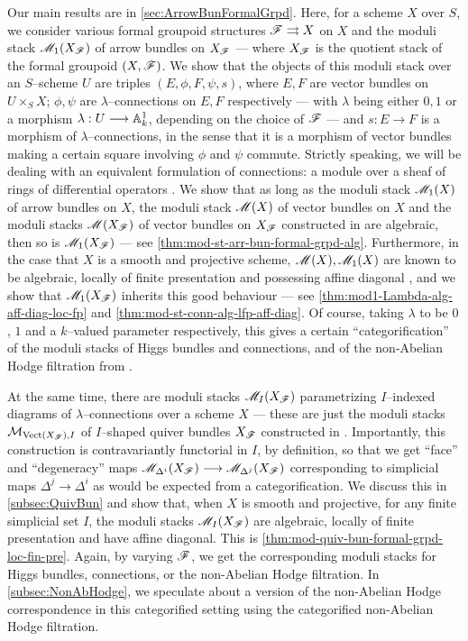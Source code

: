 \documentclass[11pt]{amsart}
\begin{document}
Our main results are in \cref{sec:ArrowBunFormalGrpd}.  Here, for a scheme $X$
over $S$, we consider various formal groupoid structures
$\mathscr{F} \rightrightarrows X$ on $X$ and the moduli stack $\mathscr{M}_1(X_\mathscr{F})$ of arrow
bundles on $X_\mathscr{F}$ --- where $X_\mathscr{F}$ is the quotient stack of the formal
groupoid $(X, \mathscr{F})$. We show that the objects of this moduli stack over an
$S$--scheme $U$ are triples $(E, \phi, F, \psi, s)$, where $E, F$ are vector
bundles on $U \times_S X$; $\phi, \psi$ are $\lambda$--connections on $E, F$
respectively --- with $\lambda$ being either $0, 1$ or a morphism
$\lambda : U \to \bA^1_k$, depending on the choice of $\mathscr{F}$ --- and
$s : E \to F$ is a morphism of $\lambda$--connections, in the sense that it is a
morphism of vector bundles making a certain square involving $\phi$ and $\psi$
commute.  Strictly speaking, we will be dealing with an equivalent formulation
of connections: a module over a sheaf of rings of differential operators
\cite[\S 2]{ModRepFunGrpI}.  We show that as long as the moduli stack $\mathscr{M}_1(X)$
of arrow bundles on $X$, the moduli stack $\mathscr{M}(X)$ of vector bundles on $X$ and
the moduli stacks $\mathscr{M}(X_\mathscr{F})$ of vector bundles on $X_\mathscr{F}$ constructed in
\cite[31---33]{NonAbHodgeFilt} are algebraic, then so is $\mathscr{M}_1(X_\mathscr{F})$ --- see
\cref{thm:mod-st-arr-bun-formal-grpd-alg}.  Furthermore, in the case that $X$ is
a smooth and projective scheme, $\mathscr{M}(X), \mathscr{M}_1(X)$ are known to be algebraic,
locally of finite presentation and possessing affine diagonal
\cites{Wang-BunG, ModQuivBun}, and we show that $\mathscr{M}_1(X_\mathscr{F})$ inherits this
good behaviour --- see \cref{thm:mod1-Lambda-alg-aff-diag-loc-fp} and
\cref{thm:mod-st-conn-alg-lfp-aff-diag}. Of course, taking $\lambda$ to be
$0$, $1$ and a $k$--valued parameter respectively, this gives a certain
``categorification'' of the moduli stacks of Higgs bundles and connections, and
of the non-Abelian Hodge filtration from \cite[31---33]{NonAbHodgeFilt}.

At the same time, there are moduli stacks $\mathscr{M}_I(X_\mathscr{F})$ parametrizing
$I$--indexed diagrams of $\lambda$--connections over a scheme $X$ --- these are
just the moduli stacks $\mathcal{M}_{\mathrm{Vect}(X_\mathscr{F}), I}$ of $I$--shaped quiver bundles
$X_\mathscr{F}$ constructed in \cite[\S 4]{ModQuivBun}.  Importantly, this construction
is contravariantly functorial in $I$, by definition, so that we get ``face'' and
``degeneracy'' maps $\sM_{\Delta^i}(X_\sF) \to \sM_{\Delta^j}(X_\sF)$
corresponding to simplicial maps $\Delta^j \to \Delta^i$ as would be expected
from a categorification.  We discuss this in \cref{subsec:QuivBun} and show
that, when $X$ is smooth and projective, for any finite simplicial set $I$, the
moduli stacks $\mathscr{M}_I(X_\mathscr{F})$ are algebraic, locally of finite presentation and
have affine diagonal. This is \cref{thm:mod-quiv-bun-formal-grpd-loc-fin-pre}.
Again, by varying $\mathscr{F}$, we get the corresponding moduli stacks for Higgs
bundles, connections, or the non-Abelian Hodge filtration. In
\cref{subsec:NonAbHodge}, we speculate about a version of the non-Abelian Hodge
correspondence in this categorified setting using the categorified non-Abelian
Hodge filtration.
\end{document}
